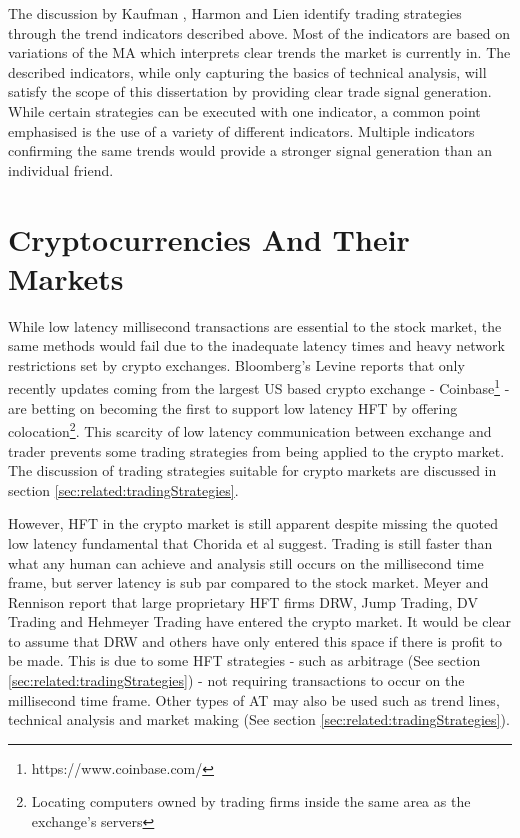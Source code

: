 The discussion by Kaufman \cite{BOOK:Kaufman:2013}, Harmon \cite{BOOK:Harmon:2014} and Lien \cite{BOOK:Lien:2016} identify trading strategies through the trend indicators described above. Most of the indicators are based on variations of the MA which interprets clear trends the market is currently in. The described indicators, while only capturing the basics of technical analysis, will satisfy the scope of this dissertation by providing clear trade signal generation. While certain strategies can be executed with one indicator, a common point emphasised is the use of a variety of different indicators. Multiple indicators confirming the same trends would provide a stronger signal generation than an individual friend. 

\section{Cryptocurrencies And Their Markets}
\label{sec:related:cryptoAndTheirMarkets}

While low latency millisecond transactions are essential to the stock market, the same methods would fail due to the inadequate latency times and heavy network restrictions set by crypto exchanges. Bloomberg's Levine reports \cite{WEB:Levine:2018} that only recently updates coming from the largest US based crypto exchange - Coinbase\footnote{https://www.coinbase.com/} - are betting on becoming the first to support low latency HFT by offering colocation\footnote{Locating computers owned by trading firms inside the same area as the exchange's servers}. This scarcity of low latency communication between exchange and trader prevents some trading strategies from being applied to the crypto market. The discussion of trading strategies suitable for crypto markets are discussed in section \ref{sec:related:tradingStrategies}.

However, HFT in the crypto market is still apparent despite missing the quoted low latency fundamental that Chorida et al \cite{REPORT:ChordiaEtAl:2013} suggest. Trading is still faster than what any human can achieve and analysis still occurs on the millisecond time frame, but server latency is sub par compared to the stock market. Meyer and Rennison \cite{ART:Meyer:2017} report that large proprietary HFT firms DRW, Jump Trading, DV Trading and Hehmeyer Trading have entered the crypto market. It would be clear to assume that DRW and others have only entered this space if there is profit to be made. This is due to some HFT strategies - such as arbitrage (See section \ref{sec:related:tradingStrategies}) - not requiring transactions to occur on the millisecond time frame. Other types of AT may also be used such as trend lines, technical analysis and market making (See section \ref{sec:related:tradingStrategies}). 

